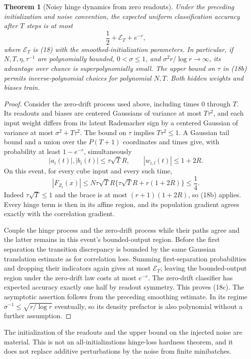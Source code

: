 \documentclass[11pt]{article}
\newtheorem{theorem}{Theorem}\newtheorem{lemma}[theorem]{Lemma}
\begin{document}
\begin{theorem}[Noisy hinge dynamics from zero readouts]
Under the preceding initialization and noise convention, the expected
uniform classification accuracy after $T$ steps is at most
\[
                 \frac12+\mathcal E_T+e^{-r},           \tag{18c}
\]
where $\mathcal E_T$ is (18) with the smoothed-initialization parameters.
In particular, if $N,T,\eta,\tau^{-1}$ are polynomially bounded,
$0<\sigma\le1$, and $\sigma^2r/\log r\to\infty$, its advantage
over chance is superpolynomially small. The upper bound on $\tau$ in
(18b) permits inverse-polynomial choices for polynomial $N,T$.
Both hidden weights and biases train.
\end{theorem}
\begin{proof}
Consider the zero-drift process used above, including times $0$ through
$T$. Its readouts and biases are centered Gaussians of variance at most
$T\tau^2$, and each input weight differs from its latent Rademacher
sign by a centered Gaussian of variance at most $\sigma^2+T\tau^2$.
The bound on $\tau$ implies $T\tau^2\le1$.
A Gaussian tail bound and a union over the $P(T+1)$ coordinates and
times give, with probability at least $1-e^{-r}$, simultaneously
\[
 |a_i(t)|,|b_i(t)|\le\tau\sqrt T R,
 \qquad |w_{i,l}(t)|\le1+2R.
\]
On this event, for every cube input and every such time,
\[
 |F_{Z_t}(x)|\le
 N\tau\sqrt T R\{\tau\sqrt T R+r(1+2R)\}\le\frac14.
\]
Indeed $\tau\sqrt T\le1$ and the brace is at most
$(r+1)(1+2R)$, so (18b) applies.
Every hinge term is then in its affine region, and its population
gradient agrees exactly with the correlation gradient.

Couple the hinge process and the zero-drift process while their paths
agree and the latter remains in this event's bounded-output region.
Before the first separation the transition discrepancy is bounded by
the same Gaussian translation estimate as for correlation loss.
Summing first-separation probabilities and dropping their indicators
again gives at most $\mathcal E_T$; leaving the bounded-output region
under the zero-drift law costs at most $e^{-r}$.
The zero-drift classifier has expected accuracy exactly one half by
readout symmetry. This proves (18c). The asymptotic assertion follows
from the preceding smoothing estimate. In its regime
$\sigma^{-1}\le\sqrt{r/\log r}$ eventually, so its density prefactor
is also polynomial without a further assumption.
\end{proof}

The initialization of the readouts and the upper bound on the injected
noise are material. This is not an all-initializations hinge-loss
hardness theorem, and it does not replace additive perturbations by
the noise from finite minibatches.
\end{document}
